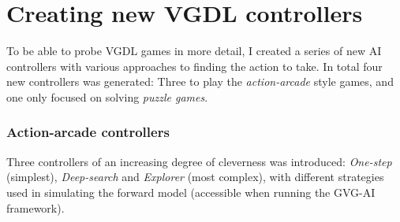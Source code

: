 \documentclass[a4paper,titlepage,final]{report}
\begin{document}

\section{Creating new VGDL controllers}
\label{sec_creatingnewcontrollers}
To be able to probe VGDL games in more detail, I created a series of new AI controllers with various approaches to finding the action to take.
In total four new controllers was generated: Three to play the \textit{action-arcade} style games, and one only focused on solving \textit{puzzle games}.

\subsubsection*{Action-arcade controllers}
Three controllers of an increasing degree of cleverness was introduced: \textit{One-step} (simplest), \textit{Deep-search} and \textit{Explorer} (most complex), with different strategies used in simulating the forward model (accessible when running the GVG-AI framework).
\end{document}
